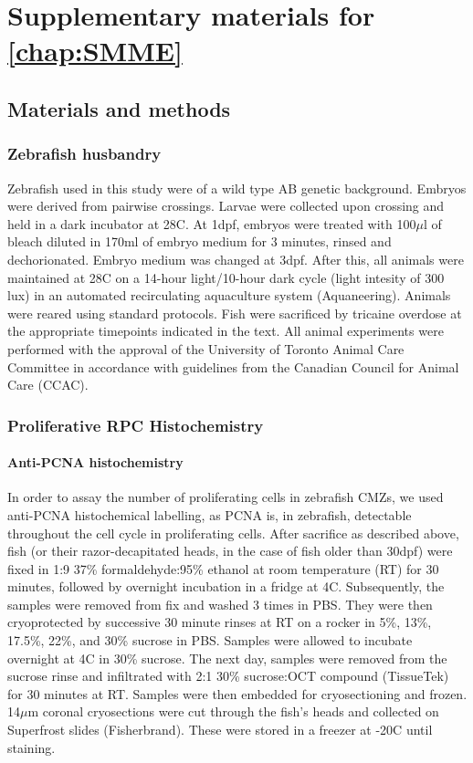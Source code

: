 \chapter{Supplementary materials for \autoref{chap:SMME}}
\label{chap:SMMsupp}
\section{Materials and methods}
\subsection{Zebrafish husbandry}
\label{ssec:husbandry}
Zebrafish used in this study were of a wild type AB genetic background. Embryos were derived from pairwise crossings. Larvae were collected upon crossing and held in a dark incubator at 28\textdegree C. At 1dpf, embryos were treated with 100$\mu$l of bleach diluted in 170ml of embryo medium for 3 minutes, rinsed and dechorionated. Embryo medium was changed at 3dpf. After this, all animals were maintained at 28\textdegree C on a 14-hour light/10-hour dark cycle (light intesity of 300 lux) in an automated recirculating aquaculture system (Aquaneering). Animals were reared using standard protocols\cite{Westerfield2000}. Fish were sacrificed by tricaine overdose at the appropriate timepoints indicated in the text. All animal experiments were performed with the approval of the University of Toronto Animal Care Committee in accordance with guidelines from the Canadian Council for Animal Care (CCAC).
 
\subsection{Proliferative RPC Histochemistry}
\subsubsection{Anti-PCNA histochemistry}
\label{ssec:PCNA}
In order to assay the number of proliferating cells in zebrafish CMZs, we used anti-PCNA histochemical labelling, as PCNA is, in zebrafish, detectable throughout the cell cycle in proliferating cells. After sacrifice as described above, fish (or their razor-decapitated heads, in the case of fish older than 30dpf) were fixed in 1:9 37\% formaldehyde:95\% ethanol at room temperature (RT) for 30 minutes, followed by overnight incubation in a fridge at 4\textdegree C. Subsequently, the samples were removed from fix and washed 3 times in PBS. They were then cryoprotected by successive 30 minute rinses at RT on a rocker in 5\%, 13\%, 17.5\%, 22\%, and 30\% sucrose in PBS. Samples were allowed to incubate overnight at 4\textdegree C in 30\% sucrose. The next day, samples were removed from the sucrose rinse and infiltrated with 2:1 30\% sucrose:OCT compound (TissueTek) for 30 minutes at RT. Samples were then embedded for cryosectioning and frozen. 14$\mu$m coronal cryosections were cut through the fish's heads and collected on Superfrost slides (Fisherbrand). These were stored in a freezer at -20\textdegree C until staining.

